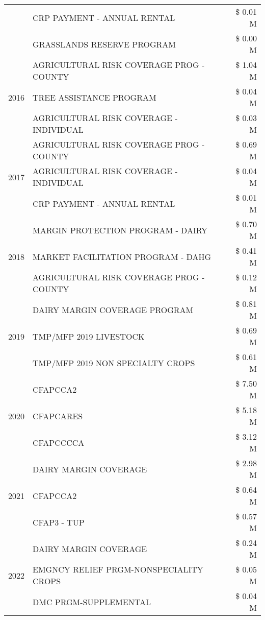 \begin{tabular}{llr}
 & CRP PAYMENT - ANNUAL RENTAL & \$ 0.01 M \\
 & GRASSLANDS RESERVE PROGRAM & \$ 0.00 M \\
\cline{1-3}
\multirow[t]{3}{*}{2016} & AGRICULTURAL RISK COVERAGE PROG - COUNTY & \$ 1.04 M \\
 & TREE ASSISTANCE PROGRAM & \$ 0.04 M \\
 & AGRICULTURAL RISK COVERAGE - INDIVIDUAL & \$ 0.03 M \\
\cline{1-3}
\multirow[t]{3}{*}{2017} & AGRICULTURAL RISK COVERAGE PROG - COUNTY & \$ 0.69 M \\
 & AGRICULTURAL RISK COVERAGE - INDIVIDUAL & \$ 0.04 M \\
 & CRP PAYMENT - ANNUAL RENTAL & \$ 0.01 M \\
\cline{1-3}
\multirow[t]{3}{*}{2018} & MARGIN PROTECTION PROGRAM - DAIRY & \$ 0.70 M \\
 & MARKET FACILITATION PROGRAM - DAHG & \$ 0.41 M \\
 & AGRICULTURAL RISK COVERAGE PROG - COUNTY & \$ 0.12 M \\
\cline{1-3}
\multirow[t]{3}{*}{2019} & DAIRY MARGIN COVERAGE PROGRAM & \$ 0.81 M \\
 & TMP/MFP 2019 LIVESTOCK & \$ 0.69 M \\
 & TMP/MFP 2019 NON SPECIALTY CROPS & \$ 0.61 M \\
\cline{1-3}
\multirow[t]{3}{*}{2020} & CFAPCCA2 & \$ 7.50 M \\
 & CFAPCARES & \$ 5.18 M \\
 & CFAPCCCCA & \$ 3.12 M \\
\cline{1-3}
\multirow[t]{3}{*}{2021} & DAIRY MARGIN COVERAGE & \$ 2.98 M \\
 & CFAPCCA2 & \$ 0.64 M \\
 & CFAP3 - TUP & \$ 0.57 M \\
\cline{1-3}
\multirow[t]{3}{*}{2022} & DAIRY MARGIN COVERAGE & \$ 0.24 M \\
 & EMGNCY RELIEF PRGM-NONSPECIALITY CROPS & \$ 0.05 M \\
 & DMC PRGM-SUPPLEMENTAL & \$ 0.04 M \\
\cline{1-3}
\bottomrule
\end{tabular}
